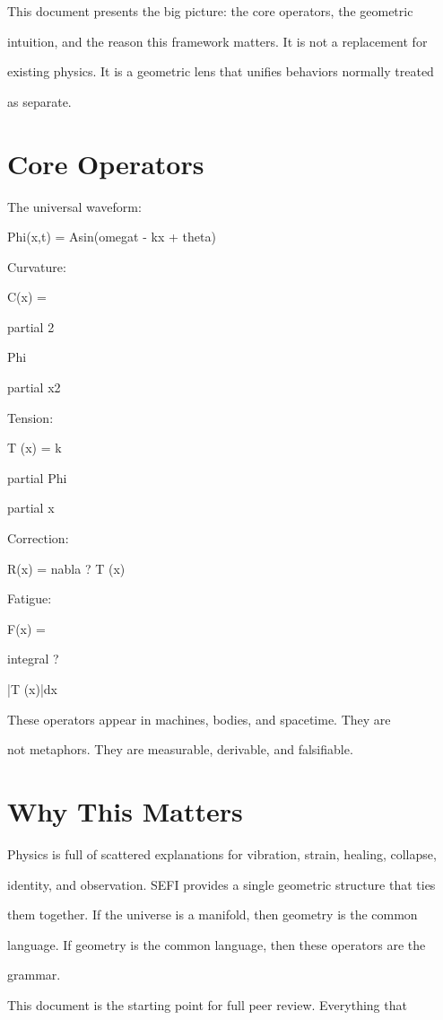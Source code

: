 \documentclass[10pt]{article}
\begin{document}
This document presents the big picture: the core operators, the geometric

intuition, and the reason this framework matters. It is not a replacement for

existing physics. It is a geometric lens that unifies behaviors normally treated

as separate.

\section*{Core Operators}
The universal waveform:

Phi(x,t) = Asin(omegat - kx + theta)

Curvature:

C(x) =

partial 2

Phi

partial x2


Tension:

T (x) = k

partial Phi

partial x

Correction:

R(x) = nabla  ? T (x)

Fatigue:

F(x) =

integral ?

|T (x)|dx

These operators appear in machines, bodies, and spacetime. They are

not metaphors. They are measurable, derivable, and falsifiable.

\section*{Why This Matters}
Physics is full of scattered explanations for vibration, strain, healing, collapse,

identity, and observation. SEFI provides a single geometric structure that ties

them together. If the universe is a manifold, then geometry is the common

language. If geometry is the common language, then these operators are the

grammar.

This document is the starting point for full peer review. Everything that
\end{document}
